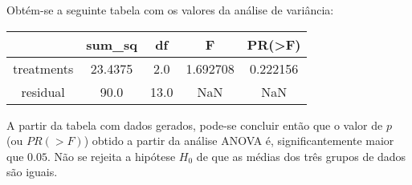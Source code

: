 Obtém-se a seguinte tabela com os valores da análise de variância:
\\

\begin{table}[ht]
    \centering
    \begin{tabular}{c|c|c|c|c}
        \hline
        \rowcolor{pagecolor!50!COLOR1}
                   & sum\_sq & df   & F        & PR(\textgreater{}F) \\ \hline
        treatments & 23.4375 & 2.0  & 1.692708 & 0.222156            \\ \hline
        residual   & 90.0    & 13.0 & NaN      & NaN                 \\ \hline
    \end{tabular}
\end{table}

A partir da tabela com dados gerados, pode-se concluir então que o valor de $p$ (ou $PR(>F)$) obtido a partir da análise ANOVA é, significantemente maior que $0.05$. Não se rejeita a hipótese $H_0$ de que as médias dos três grupos de dados são iguais.